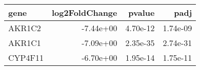 \begin{tabular}{lrrr}
\toprule
   gene &  log2FoldChange &   pvalue &     padj \\
\midrule
 AKR1C2 &       -7.44e+00 & 4.70e-12 & 1.74e-09 \\
 AKR1C1 &       -7.09e+00 & 2.35e-35 & 2.74e-31 \\
CYP4F11 &       -6.70e+00 & 1.95e-14 & 1.75e-11 \\
\bottomrule
\end{tabular}
